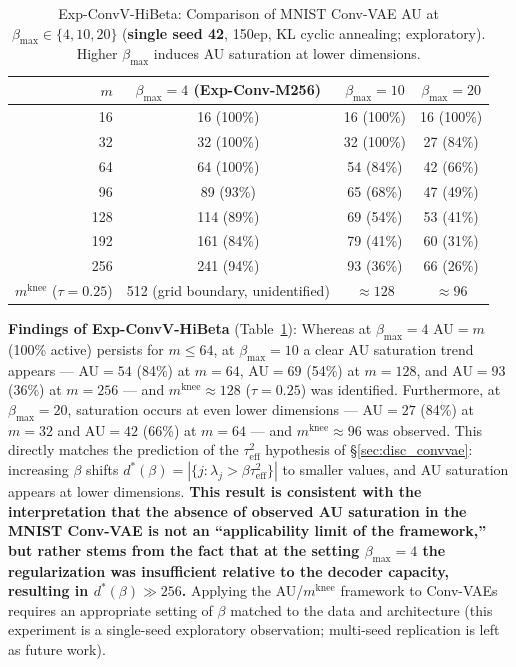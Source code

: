 \documentclass[make,article,submit,pdftex,moreauthors]{Definitions/mdpi}
\newcommand{\mknee}{m^{\mathrm{knee}}}
\begin{document}
\begin{table}[H]
\centering
\caption{Exp-ConvV-HiBeta: Comparison of MNIST Conv-VAE AU at $\beta_\mathrm{max} \in \{4, 10, 20\}$ (\textbf{single seed 42}, 150ep, KL cyclic annealing; exploratory). Higher $\beta_\mathrm{max}$ induces AU saturation at lower dimensions.}
\label{tab:hibeta}
\small
\begin{tabular}{r ccc}
\toprule
$m$ & $\beta_{\max}=4$ (Exp-Conv-M256) & $\beta_{\max}=10$ & $\beta_{\max}=20$ \\
\midrule
 16  & 16  (100\%)& 16 (100\%) & 16 (100\%) \\
 32  & 32  (100\%)& 32 (100\%) & 27 (84\%)  \\
 64  & 64  (100\%)& 54 (84\%)  & 42 (66\%)  \\
 96  & 89  (93\%) & 65 (68\%)  & 47 (49\%)  \\
128  & 114 (89\%) & 69 (54\%)  & 53 (41\%)  \\
192  & 161 (84\%) & 79 (41\%)  & 60 (31\%)  \\
256  & 241 (94\%) & 93 (36\%)  & 66 (26\%)  \\
\midrule
$\mknee$ ($\tau=0.25$) & 512 (grid boundary, unidentified) & $\approx 128$ & $\approx 96$ \\
\bottomrule
\end{tabular}
\end{table}

\textbf{Findings of Exp-ConvV-HiBeta} (Table~\ref{tab:hibeta}):
Whereas at $\beta_{\max}=4$ AU$=m$ (100\% active) persists for $m \leq 64$,
at $\beta_{\max}=10$ a clear AU saturation trend appears --- AU$=54$ (84\%) at $m=64$,
AU$=69$ (54\%) at $m=128$, and AU$=93$ (36\%) at $m=256$ ---
and $\mknee \approx 128$ ($\tau=0.25$) was identified.
Furthermore, at $\beta_{\max}=20$, saturation occurs at even lower dimensions ---
AU$=27$ (84\%) at $m=32$ and AU$=42$ (66\%) at $m=64$ --- and $\mknee \approx 96$ was observed.
This directly matches the prediction of the $\tau^2_\mathrm{eff}$ hypothesis of \S\ref{sec:disc_convvae}:
increasing $\beta$ shifts $d^*(\beta) = |\{j: \lambda_j > \beta\tau^2_\mathrm{eff}\}|$ to smaller values,
and AU saturation appears at lower dimensions.
\textbf{This result is consistent with the interpretation that the absence of observed AU saturation
in the MNIST Conv-VAE is not an ``applicability limit of the framework,'' but rather stems from the fact
that at the setting $\beta_{\max}=4$ the regularization was insufficient relative to the decoder capacity,
resulting in $d^*(\beta) \gg 256$.}
Applying the AU/$\mknee$ framework to Conv-VAEs requires an appropriate setting of $\beta$
matched to the data and architecture
(this experiment is a single-seed exploratory observation; multi-seed replication
is left as future work).
\end{document}
